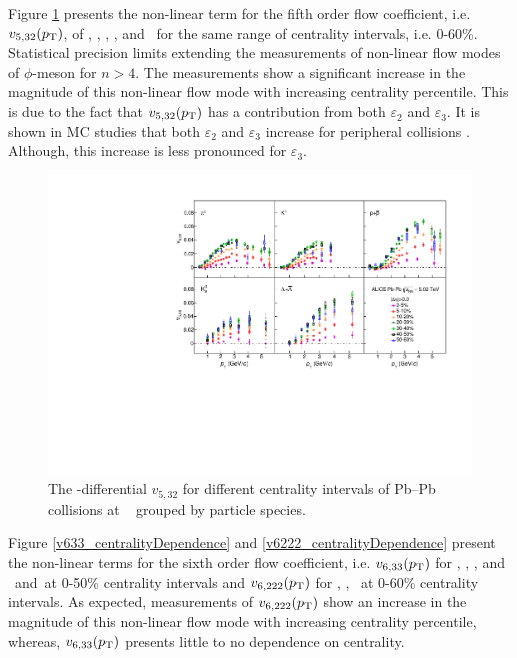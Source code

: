 \documentclass[ALICE,manyauthors]{cernphprep}
\begin{document}
Figure \ref{v523_centralityDependence} presents the non-linear term for the fifth order flow coefficient, i.e. $v_{5,32}(p_{\rm{T}})$, of \pion, \kaon, \Ks, \proton, and \lambdas~for the same range of centrality intervals, i.e. 0-60\%. Statistical precision limits extending the measurements of non-linear flow modes of $\phi$-meson for $n>4$. The measurements show a significant increase in the magnitude of this non-linear flow mode with increasing centrality percentile. This is due to the fact that $v_{5,32}(p_{\rm{T}})$ has a contribution from both $\varepsilon_{2}$ and $\varepsilon_{3}$. It is shown in MC studies that both $\varepsilon_{2}$ and $\varepsilon_{3}$ increase for peripheral collisions \cite{Alver:2010gr}. Although, this increase is less pronounced for $\varepsilon_{3}$.

\begin{figure}[!htb]
\begin{center}
\includegraphics[scale=0.82]{figures/results/All_v523_gap00_CentDep_PID2.pdf}
\end{center}
\caption{The \pT-differential $v_{5,32}$ for different centrality intervals of Pb--Pb collisions at \sNN~ grouped by particle species.}
\label{v523_centralityDependence}
\end{figure}

Figure \ref{v633_centralityDependence} and \ref{v6222_centralityDependence} present the non-linear terms for the sixth order flow coefficient, i.e. $v_{6,33}(p_{\rm{T}})$ for \pion, \kaon, \Ks, \proton and \lambdas~and~at 0-50\% centrality intervals and $v_{6,222}(p_{\rm{T}})$ for \pion, \kaon, \proton~at 0-60\% centrality intervals. As expected, measurements of $v_{6,222}(p_{\rm{T}})$ show an increase in the magnitude of this non-linear flow mode with increasing centrality percentile, whereas, $v_{6,33}(p_{\rm{T}})$ presents little to no dependence on centrality. 
\end{document}
